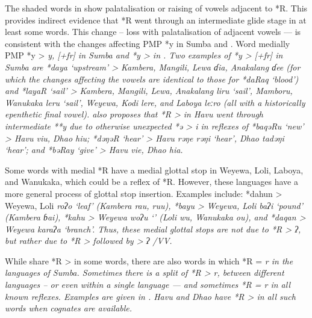The shaded words in  show palatalisation or raising
of vowels adjacent to *R.
This provides indirect evidence that *R went through an intermediate
glide stage in at least some words.
This change -- loss with palatalisation of adjacent vowels ---
is consistent with the changes affecting PMP *y in Sumba and .
Word medially PMP *y > \it{y,} {\0}[+fr] in Sumba
and *y > {\0} in .
Two examples of *y > {\0}[+fr] in Sumba are *daya ‘upstream’
>  Kambera,
Mangili, Lewa \it{ɗia}, Anakalang \it{ɗee} (for which the changes
affecting the vowels are identical to those for *daRaq ‘blood’)
and *layaR ‘sail’ > Kambera,
Mangili, Lewa, Anakalang \it{liru} ‘sail’, Mamboru,
Wanukaka \it{leru} ‘sail’, Weyewa,
Kodi \it{lere}, and Laboya \it{leːro} (all with a historically epenthetic final vowel).
\citet[69]{Blust2008} also proposes that *R > {\0} in Havu went
through intermediate **y due to otherwise unexpected *ə > \it{i}
in reflexes of *baqəRu ‘new’ > Havu \it{viu,} Dhao \it{hiu};
*dəŋəR ‘hear’ > Havu \it{rəŋe {\tl} rəŋi} ‘hear', Dhao \it{tadəŋi} ‘hear’;
and *bəRay ‘give’ > Havu \it{vie}, Dhao \it{hia}.

Some words with medial *R have a medial glottal stop in Weyewa,
Loli, Laboya, and Wanukaka, which could be a reflex of *R.
However, these languages have a more general process of glottal stop insertion.
Examples include: *dahun > Weyewa,
Loli \it{roʔo} ‘leaf’ (Kambera \it{rau,
ruu}), *bayu > Weyewa, Loli \it{baʔi} ‘pound’ (Kambera \it{ɓai}),
*kahu > Weyewa \it{woʔu} ‘’ (Loli \it{wu,} Wanukaka
\it{ou)}, and *daqan > Weyewa \it{karaʔa} ‘branch’.
Thus, these medial glottal stops are not due to *R > \it{ʔ},
but rather due to *R > {\0} followed by {\0} > \it{ʔ} /V{\gap}V.

\clearpage
While  share *R > {\0} in some words,
there are also words in which *R = \it{r} in the languages of Sumba.
Sometimes there is a split of *R > \it{r,} {\0} between different
languages -- or even within a single language ---
and sometimes *R = \it{r} in all known reflexes.
Examples are given in .
Havu and Dhao have *R > {\0} in all such words when cognates are available.

